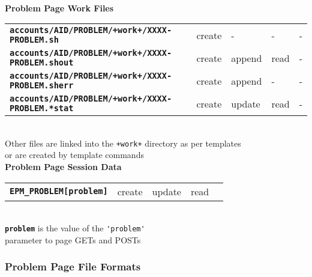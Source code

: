 \documentclass[12pt]{article}
\newcommand{\TT}[1]{{\tt \bfseries #1}}
\begin{document}
\begin{center}
\begin{tabular}{lllll}
\end{tabular}
\\\bigskip
{\bf Problem Page Work Files}
\\[1ex]
\begin{tabular}{lllll}
\TT{accounts/AID/PROBLEM/+work+/XXXX-PROBLEM.sh}     & create  & - & - & - \\
\TT{accounts/AID/PROBLEM/+work+/XXXX-PROBLEM.shout}  & create  & append & read
                                                                        & - \\
\TT{accounts/AID/PROBLEM/+work+/XXXX-PROBLEM.sherr}  & create  & append & -
                                                                        & - \\
\TT{accounts/AID/PROBLEM/+work+/XXXX-PROBLEM.*stat}  & create  & update & read
                                                                        & - \\
\end{tabular}
\\[2ex]
Other files are linked into the {\tt +work+} directory
as per templates \\
or are created by template commands
\\[3ex]
{\bf Problem Page Session Data}
\\[1ex]
\begin{tabular}{lllll}
\TT{EPM\_PROBLEM[problem]}
		& create  & update & read \\
\end{tabular}
\\[3ex]
\TT{problem} is the value of the \verb|'problem'| \\
parameter to page GETs and POSTs
\end{center}

\subsubsection{Problem Page File Formats}
\end{document}
